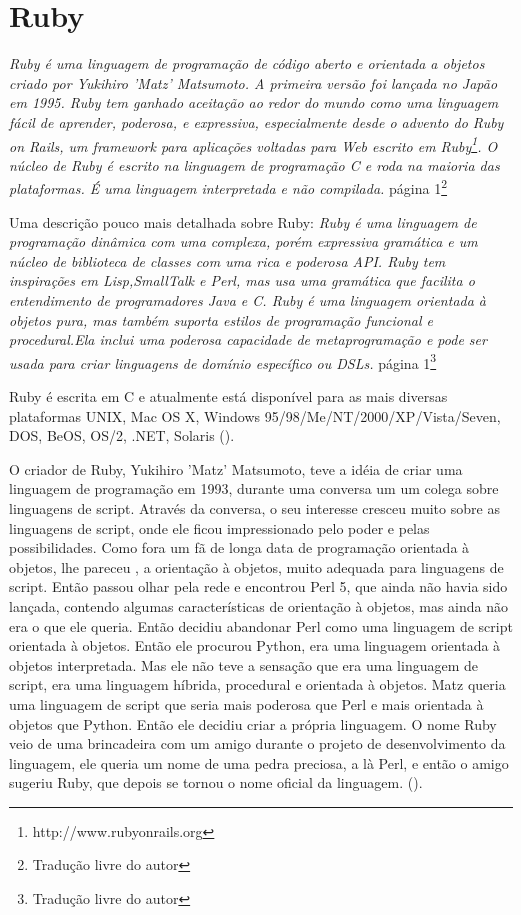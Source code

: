 \chapter{Ruby}

\emph{Ruby é uma linguagem de programação de código aberto e orientada a objetos criado por Yukihiro 'Matz' Matsumoto. A primeira versão foi lançada no Japão em 1995. Ruby tem ganhado aceitação ao redor do mundo como uma linguagem fácil de aprender, poderosa, e expressiva, especialmente desde o advento do Ruby on Rails, um framework para aplicações voltadas para Web escrito em Ruby\footnote{http://www.rubyonrails.org}. O núcleo de Ruby é escrito na linguagem de programação C e roda na maioria das plataformas. É uma linguagem interpretada e não compilada.}
\cite{ruby_pocket_reference}{página 1}\footnote{Tradução livre do autor}

Uma descrição pouco mais detalhada sobre Ruby: \emph{Ruby é uma linguagem de programação dinâmica com uma complexa, porém expressiva gramática e um núcleo de  biblioteca de classes com uma rica e poderosa API. Ruby tem inspirações em Lisp,SmallTalk e Perl, mas usa uma gramática que facilita o entendimento de programadores Java e C. Ruby é uma linguagem orientada à objetos pura, mas também suporta estilos de programação funcional e procedural.Ela inclui uma poderosa capacidade de metaprogramação e pode ser usada para criar linguagens de domínio específico ou DSLs.} 
\cite{the_ruby_proggraming_language}{página 1}\footnote{Tradução livre do autor}

Ruby é escrita em C e atualmente está disponível para as mais diversas plataformas UNIX, Mac OS X, Windows 95/98/Me/NT/2000/XP/Vista/Seven, DOS, BeOS, OS/2, .NET, Solaris (\cite{ruby_official_website}).

O criador de Ruby, Yukihiro 'Matz' Matsumoto, teve a idéia de criar uma linguagem de programação em 1993, durante uma conversa um um colega sobre linguagens de script. Através da conversa, o seu interesse cresceu muito sobre as linguagens de script, onde ele ficou impressionado pelo poder e pelas possibilidades. Como fora um fã de longa data de programação orientada à objetos, lhe pareceu , a orientação à objetos, muito adequada para linguagens de script. Então passou olhar pela rede e encontrou Perl 5, que ainda não havia sido lançada, contendo algumas características de orientação à objetos, mas ainda não era o que ele queria. Então decidiu abandonar Perl como uma linguagem de script orientada à objetos. Então ele procurou Python, era uma linguagem orientada à objetos interpretada. Mas ele não teve a sensação que era uma linguagem de script, era uma linguagem híbrida, procedural e orientada à objetos. Matz queria uma linguagem de script que seria mais poderosa que Perl e mais orientada à objetos que Python. Então ele decidiu criar a própria linguagem. O nome Ruby veio de uma brincadeira com um amigo durante o projeto de desenvolvimento da linguagem, ele queria um nome de uma pedra preciosa, a là Perl, e então o amigo sugeriu Ruby, que depois se tornou o nome oficial da linguagem.  (\cite{inverview_with_matz}).

